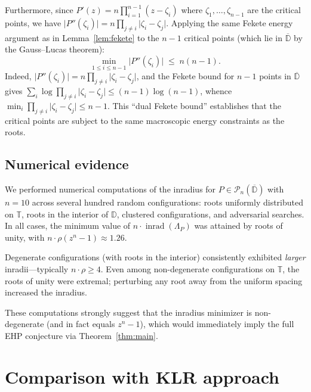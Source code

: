\documentclass[11pt,a4paper]{amsart}
\theoremstyle{definition}
\newcommand{\D}{\mathbb{D}}
\newcommand{\T}{\mathbb{T}}
\newcommand{\Pn}{\mathcal{P}_n}
\newcommand{\abs}[1]{\lvert #1 \rvert}
\newcommand{\inrad}{\operatorname{inrad}}
\begin{document}
Furthermore, since $P'(z) = n\prod_{i=1}^{n-1}(z - \zeta_i)$ where
$\zeta_1, \ldots, \zeta_{n-1}$ are the critical points, we have
$\abs{P''(\zeta_i)} = n\prod_{j \neq i}\abs{\zeta_i - \zeta_j}$.
Applying the same Fekete energy argument as in Lemma~\ref{lem:fekete}
to the $n-1$ critical points (which lie in $\overline{\D}$ by the
Gauss--Lucas theorem):
\begin{equation}\label{eq:dual-fekete}
  \min_{1 \leq i \leq n-1} \abs{P''(\zeta_i)} \;\leq\; n(n-1).
\end{equation}
Indeed, $\abs{P''(\zeta_i)} = n\prod_{j \neq i}\abs{\zeta_i - \zeta_j}$,
and the Fekete bound for $n-1$ points in $\overline{\D}$ gives
$\sum_{i} \log\prod_{j \neq i}\abs{\zeta_i - \zeta_j} \leq (n-1)\log(n-1)$,
whence $\min_i \prod_{j\neq i}\abs{\zeta_i - \zeta_j} \leq n-1$.
This ``dual Fekete bound'' establishes that the critical points are
subject to the same macroscopic energy constraints as the roots.

\subsection{Numerical evidence}
\label{sec:numerics}

We performed numerical computations of the inradius for
$P \in \Pn(\overline{\D})$ with $n = 10$ across several
hundred random configurations: roots uniformly distributed on $\T$,
roots in the interior of $\D$, clustered configurations, and
adversarial searches.  In all cases, the minimum value of
$n \cdot \inrad(\Lambda_P)$ was attained by roots of unity,
with $n \cdot \rho(z^n - 1) \approx 1.26$.

Degenerate configurations (with roots in the interior) consistently
exhibited \emph{larger} inradii---typically $n \cdot \rho \geq 4$.
Even among non-degenerate configurations on $\T$, the roots of unity
were extremal; perturbing any root away from the uniform spacing
increased the inradius.

These computations strongly suggest that the inradius minimizer is
non-degenerate (and in fact equals $z^n - 1$), which would immediately
imply the full EHP conjecture via Theorem~\ref{thm:main}.

\section{Comparison with KLR approach}
\end{document}
